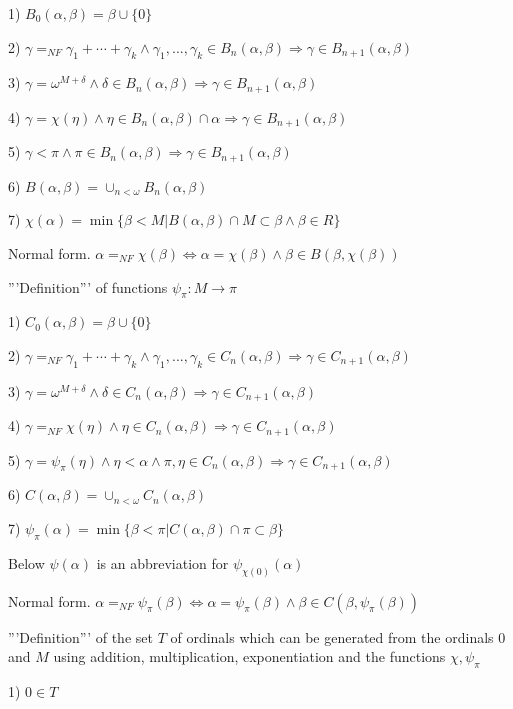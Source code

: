 \documentclass[10pt]{article}
\begin{document}
1) \(B_0(\alpha,\beta)=\beta\cup\{0\}\)

2) \(\gamma=_{NF}\gamma_1+\cdots+\gamma_k\wedge\gamma_1,...,\gamma_k\in B_n(\alpha,\beta)\Rightarrow\gamma\in B_{n+1}(\alpha,\beta)\)

3) \(\gamma=\omega^{M+\delta}\wedge\delta\in B_n(\alpha,\beta)\Rightarrow\gamma\in B_{n+1}(\alpha,\beta)\)

4) \(\gamma=\chi(\eta)\wedge\eta\in B_n(\alpha,\beta)\cap\alpha \Rightarrow\gamma\in B_{n+1}(\alpha,\beta)\)

5) \(\gamma<\pi\wedge\pi\in B_n(\alpha,\beta) \Rightarrow\gamma\in B_{n+1}(\alpha,\beta)\)

6) \(B(\alpha,\beta)=\cup_{n<\omega}B_n(\alpha,\beta)\)

7) \(\chi(\alpha)=\min\{\beta<M|B(\alpha,\beta)\cap M\subset\beta\wedge\beta\in R\}\)

Normal form. \(\alpha=_{NF}\chi(\beta)\Leftrightarrow\alpha=\chi(\beta)\wedge\beta\in B(\beta,\chi(\beta))\)

'''Definition''' of functions \(\psi_\pi:M\rightarrow \pi\)

1) \(C_0(\alpha,\beta)=\beta\cup\{0\}\)

2) \(\gamma=_{NF}\gamma_1+\cdots+\gamma_k\wedge\gamma_1,...,\gamma_k \in C_n(\alpha,\beta)\Rightarrow\gamma\in C_{n+1}(\alpha,\beta)\)

3) \(\gamma=\omega^{M+\delta}\wedge\delta\in C_n(\alpha,\beta)\Rightarrow\gamma\in C_{n+1}(\alpha,\beta)\)

4) \(\gamma=_{NF}\chi(\eta)\wedge\eta\in C_n(\alpha,\beta) \Rightarrow\gamma\in C_{n+1}(\alpha,\beta)\)

5) \(\gamma=\psi_\pi(\eta)\wedge\eta<\alpha\wedge\pi,\eta\in C_n(\alpha,\beta)\Rightarrow\gamma\in C_{n+1}(\alpha,\beta)\)

6) \(C(\alpha,\beta)=\cup_{n<\omega}C_n(\alpha,\beta)\)

7) \(\psi_\pi(\alpha)=\min\{\beta<\pi|C(\alpha,\beta)\cap \pi\subset\beta\}\)

Below \(\psi(\alpha)\) is an abbreviation for \(\psi_{\chi(0)}(\alpha)\)

Normal form. \(\alpha=_{NF}\psi_\pi(\beta)\Leftrightarrow\alpha=\psi_\pi(\beta)\wedge\beta\in C(\beta,\psi_\pi(\beta))\)

'''Definition''' of the set \(T\) of ordinals which can be generated from the ordinals \(0\) and \(M\) using addition, multiplication, exponentiation and the functions \(\chi,\psi_\pi\)

1) \(0\in T\)
\end{document}
